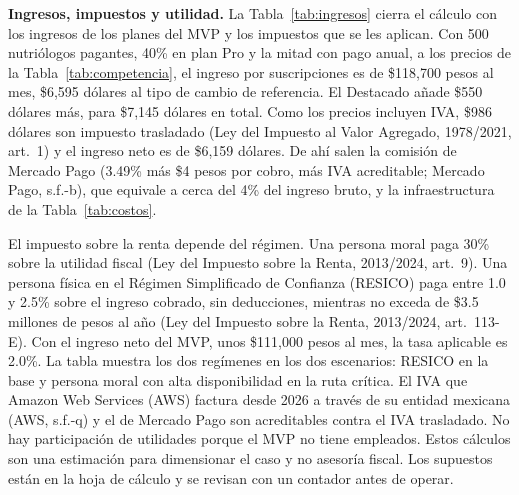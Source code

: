 \documentclass[12pt, a4paper]{article}
\begin{document}
\textbf{Ingresos, impuestos y utilidad.} La Tabla~\ref{tab:ingresos}
cierra el cálculo con los ingresos de los planes del MVP y los impuestos
que se les aplican. Con 500 nutriólogos pagantes, 40\% en plan Pro y la
mitad con pago anual, a los precios de la Tabla~\ref{tab:competencia},
el ingreso por suscripciones es de \$118,700 pesos al mes, \$6,595
dólares al tipo de cambio de referencia. El Destacado añade \$550
dólares más, para \$7,145 dólares en total. Como los precios incluyen
IVA, \$986 dólares son impuesto trasladado (Ley del Impuesto al Valor
Agregado, 1978/2021, art.~1) y el ingreso neto es de \$6,159 dólares. De
ahí salen la comisión de Mercado Pago (3.49\% más \$4 pesos por cobro,
más IVA acreditable; Mercado Pago, s.f.-b), que equivale a cerca del 4\%
del ingreso bruto, y la infraestructura de la Tabla~\ref{tab:costos}.

El impuesto sobre la renta depende del régimen. Una persona moral paga
30\% sobre la utilidad fiscal (Ley del Impuesto sobre la Renta,
2013/2024, art.~9). Una persona física en el Régimen Simplificado de
Confianza (RESICO) paga entre 1.0 y 2.5\% sobre el ingreso cobrado, sin
deducciones, mientras no exceda de \$3.5 millones de pesos al año (Ley
del Impuesto sobre la Renta, 2013/2024, art.~113-E). Con el ingreso neto
del MVP, unos \$111,000 pesos al mes, la tasa aplicable es 2.0\%. La
tabla muestra los dos regímenes en los dos escenarios: RESICO en la base
y persona moral con alta disponibilidad en la ruta crítica. El IVA que
Amazon Web Services (AWS) factura desde 2026 a través de su entidad
mexicana (AWS, s.f.-q) y el de Mercado Pago son acreditables contra el
IVA trasladado. No hay participación de utilidades porque el MVP no
tiene empleados. Estos cálculos son una estimación para dimensionar el
caso y no asesoría fiscal. Los supuestos están en la hoja de cálculo y
se revisan con un contador antes de operar.
 
\end{document}
